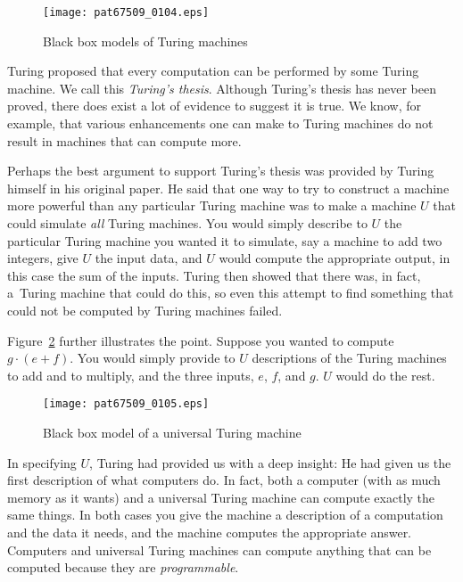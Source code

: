 \documentclass{patt}
\begin{document}
\begin{figure}[t]
\centerline{\texttt{[image: pat67509\_0104.eps]}}
\caption{Black box models of Turing machines}
\label{fig:turing_machine}
\end{figure}

Turing proposed that every computation
can be performed by some Turing machine.  We call this
{\em Turing's thesis}.  Although Turing's thesis has never
been proved, there does exist a lot of evidence to suggest it is true.
We know, for example, that various enhancements one can make to Turing machines
do not result in machines that can compute more.

Perhaps the best argument to support Turing's thesis was provided by Turing
himself in his original paper.
He said that one way to try to construct a machine more powerful
than any particular Turing machine was to make a machine $U$ that could
simulate {\em all} Turing machines.  You would simply describe to
$U$ the particular Turing machine you wanted it to
simulate, say a machine to add two integers, give $U$ the input
data, and $U$ would compute the appropriate
output, in this case the sum of the inputs.
Turing then showed that there was, in fact, a~Turing machine that could do this, so even this attempt
to find something that could not be computed by
Turing machines failed.

Figure~\ref{fig:utm}  further illustrates the point.  Suppose you 
wanted to
compute \mbox{$g\cdot(e+f)$.} You would simply provide to $U$
descriptions of the Turing machines to add and to multiply,
and the three inputs, $e$, $f$, and $g$.  $U$ would do the
rest.

\begin{figure}[hb]
\centerline{\texttt{[image: pat67509\_0105.eps]}}
\caption{Black box model of a universal Turing machine}
\label{fig:utm}

\end{figure}

In specifying $U$, Turing had provided us with a deep insight:
He had given us the first description of what computers do.
In fact, both a computer (with as much memory as
it wants) and a universal Turing machine can compute exactly
the same things. In both cases you give the machine a
description of a computation  and the data it needs,
and the machine computes the appropriate answer.
Computers and universal Turing
machines can compute anything that can be computed because
they are {\em programmable}.
\end{document}
